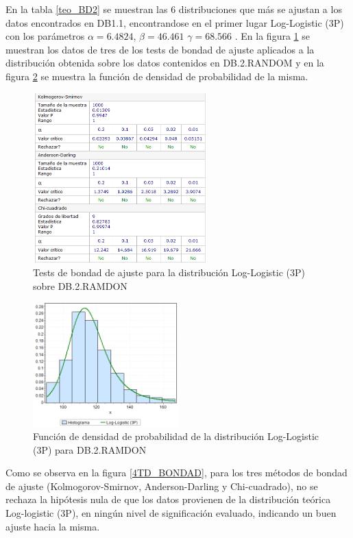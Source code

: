 \documentclass[12pt]{report}
\begin{document}
En la tabla \ref{teo_BD2}  se muestran las 6 distribuciones que más se ajustan a los datos encontrados en DB1.1, encontrandose en el primer lugar Log-Logistic (3P) con los parámetros $\alpha=6.4824$, $\beta=46.461$ $\gamma=68.566$ . En la figura \ref{5TD_BONDAD} se  muestran los datos de tres de los tests de bondad de ajuste aplicados a la distribución obtenida sobre los datos contenidos en DB.2.RANDOM y en la figura \ref{5TD_FDP} se muestra la función de densidad de probabilidad de la misma. 
\begin{figure}[ht]
	\centering
	
	\includegraphics[width=0.6\textwidth]{4td_bondad.png}
	\caption{Tests de bondad de ajuste para la distribución Log-Logistic (3P) sobre DB.2.RAMDON}
	\label{5TD_BONDAD}
\end{figure}

\begin{figure}[ht]
	\centering
	
	\includegraphics[width=0.5\textwidth]{4td_fdp.png}
	\caption{Función de densidad de probabilidad de la  distribución Log-Logistic (3P) para DB.2.RAMDON}
	\label{5TD_FDP}
\end{figure}

Como se observa en la figura  \ref{4TD_BONDAD}, para los tres métodos de bondad de ajuste (Kolmogorov-Smirnov, Anderson-Darling y Chi-cuadrado), no se rechaza la hipótesis nula de que los datos provienen de la distribución teórica Log-logistic (3P), en ningún nivel de significación evaluado, indicando un buen ajuste hacia la misma.
\end{document}
